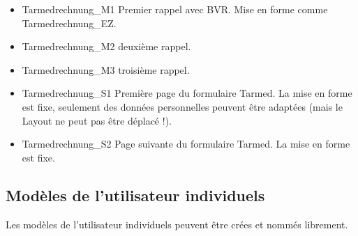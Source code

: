 \begin{itemize}
  [Leistungen] doit apparaître. Le tiers en bas doit rester libre pour l'impression du BVR.
  \item {Tarmedrechnung\_M1} Premier rappel avec BVR. Mise en forme comme Tarmedrechnung\_EZ.
  \item {Tarmedrechnung\_M2} deuxième rappel.
  \item {Tarmedrechnung\_M3} troisième rappel.
  \item {Tarmedrechnung\_S1} Première page du formulaire Tarmed. La mise en forme est fixe, seulement des données personnelles peuvent être adaptées (mais le Layout ne peut pas être déplacé !).
  \item {Tarmedrechnung\_S2} Page suivante du formulaire Tarmed. La mise en forme est fixe.
\end{itemize}


\subsection{Modèles de l'utilisateur individuels}
Les modèles de l'utilisateur individuels peuvent être crées et nommés librement. 
